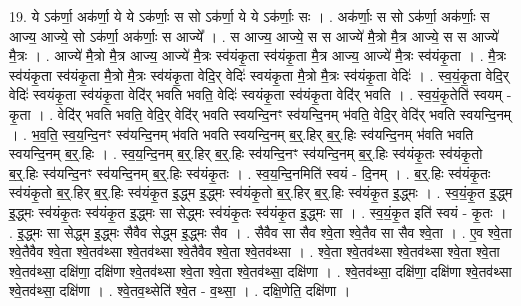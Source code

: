 \documentclass[17pt]{extarticle}
\begin{document}
19. ये ऽक॑र्णा॒ अक॑र्णा॒ ये ये ऽक॑र्णाः॒ स सो ऽक॑र्णा॒ ये ये ऽक॑र्णाः॒ सः । . अक॑र्णाः॒ स सो ऽक॑र्णा॒ अक॑र्णाः॒ स आज्य॒ आज्ये॒ सो ऽक॑र्णा॒ अक॑र्णाः॒ स आज्ये᳚ । . स आज्य॒ आज्ये॒ स स आज्ये॑ मै॒त्रो मै॒त्र आज्ये॒ स स आज्ये॑ मै॒त्रः । . आज्ये॑ मै॒त्रो मै॒त्र आज्य॒ आज्ये॑ मै॒त्रः स्व॑यंकृ॒ता स्व॑यंकृ॒ता मै॒त्र आज्य॒ आज्ये॑ मै॒त्रः स्व॑यंकृ॒ता । . मै॒त्रः स्व॑यंकृ॒ता स्व॑यंकृ॒ता मै॒त्रो मै॒त्रः स्व॑यंकृ॒ता वेदि॒र् वेदिः॑ स्वयंकृ॒ता मै॒त्रो मै॒त्रः स्व॑यंकृ॒ता वेदिः॑ । . स्व॒यं॒कृ॒ता वेदि॒र् वेदिः॑ स्वयंकृ॒ता स्व॑यंकृ॒ता वेदि॑र् भवति भवति॒ वेदिः॑ स्वयंकृ॒ता स्व॑यंकृ॒ता वेदि॑र् भवति । . स्व॒यं॒कृ॒तेति॑ स्वयम् - कृ॒ता । . वेदि॑र् भवति भवति॒ वेदि॒र् वेदि॑र् भवति स्वयन्दि॒नꣳ स्व॑यन्दि॒नम् भ॑वति॒ वेदि॒र् वेदि॑र् भवति स्वयन्दि॒नम् । . भ॒व॒ति॒ स्व॒य॒न्दि॒नꣳ स्व॑यन्दि॒नम् भ॑वति भवति स्वयन्दि॒नम् ब॒र्॒.हिर् ब॒र्॒.हिः स्व॑यन्दि॒नम् भ॑वति भवति स्वयन्दि॒नम् ब॒र्॒.हिः । . स्व॒य॒न्दि॒नम् ब॒र्॒.हिर् ब॒र्॒.हिः स्व॑यन्दि॒नꣳ स्व॑यन्दि॒नम् ब॒र्॒.हिः स्व॑यंकृ॒तः स्व॑यंकृ॒तो ब॒र्॒.हिः स्व॑यन्दि॒नꣳ स्व॑यन्दि॒नम् ब॒र्॒.हिः स्व॑यंकृ॒तः । . स्व॒य॒न्दि॒नमिति॑ स्वयं - दि॒नम् । . ब॒र्॒.हिः स्व॑यंकृ॒तः स्व॑यंकृ॒तो ब॒र्॒.हिर् ब॒र्॒.हिः स्व॑यंकृ॒त इ॒द्ध्म इ॒द्ध्मः स्व॑यंकृ॒तो ब॒र्॒.हिर् ब॒र्॒.हिः स्व॑यंकृ॒त इ॒द्ध्मः । . स्व॒यं॒कृ॒त इ॒द्ध्म इ॒द्ध्मः स्व॑यंकृ॒तः स्व॑यंकृ॒त इ॒द्ध्मः सा सेद्ध्मः स्व॑यंकृ॒तः स्व॑यंकृ॒त इ॒द्ध्मः सा । . स्व॒यं॒कृ॒त इति॑ स्वयं - कृ॒तः । . इ॒द्ध्मः सा सेद्ध्म इ॒द्ध्मः सैवैव सेद्ध्म इ॒द्ध्मः सैव । . सैवैव सा सैव श्वे॒ता श्वे॒तैव सा सैव श्वे॒ता । . ए॒व श्वे॒ता श्वे॒तैवैव श्वे॒ता श्वे॒तव॑थ्सा श्वे॒तव॑थ्सा श्वे॒तैवैव श्वे॒ता श्वे॒तव॑थ्सा । . श्वे॒ता श्वे॒तव॑थ्सा श्वे॒तव॑थ्सा श्वे॒ता श्वे॒ता श्वे॒तव॑थ्सा॒ दक्षि॑णा॒ दक्षि॑णा श्वे॒तव॑थ्सा श्वे॒ता श्वे॒ता श्वे॒तव॑थ्सा॒ दक्षि॑णा । . श्वे॒तव॑थ्सा॒ दक्षि॑णा॒ दक्षि॑णा श्वे॒तव॑थ्सा श्वे॒तव॑थ्सा॒ दक्षि॑णा । . श्वे॒तव॒थ्सेति॑ श्वे॒त - व॒थ्सा॒ । . दक्षि॒णेति॒ दक्षि॑णा । \newline
\pagebreak
{}
\end{document}
